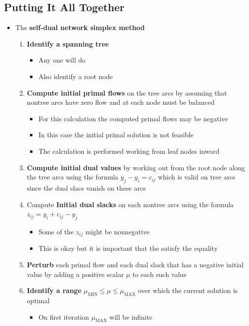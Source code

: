 \documentclass[11pt]{article}
\begin{document}
\subsection{Putting It All Together}
\label{sec:orgc6a8be1}
\begin{itemize}
\item The \textbf{self-dual network simplex method}
\begin{enumerate}
\item \textbf{Identify a spanning tree}
\begin{itemize}
\item Any one will do
\item Also identify a root node
\end{itemize}
\item \textbf{Compute initial primal flows} on the tree arcs by assuming that nontree arcs have zero flow and at each node must be balanced
\begin{itemize}
\item For this calculation the computed primal flows may be negative
\item In this case the initial primal solution is not feasible
\item The calculation is performed working from leaf nodes inward
\end{itemize}
\item \textbf{Compute initial dual values} by working out from the root node along the tree arcs using the formula \(y_j - y_i = c_{ij}\) which is valid on tree arcs since the dual slacs vanish on these arcs
\item Compute \textbf{Initial dual slacks} on each nontree arcs using the formula \(z_{ij} = y_i + c_{ij} - y_j\)
\begin{itemize}
\item Some of the \(z_{ij}\) might be nonnegative
\item This is okay but it is important that the satisfy the equality
\end{itemize}
\item \textbf{Perturb} each primal flow and each dual slack that has a negative initial value by adding a positive scalar \(\mu\) to each such value
\item \textbf{Identify a range} \(\mu_{\text{MIN}} \leq \mu \leq \mu_{\text{MAX}}\) over which the current solution is optimal
\begin{itemize}
\item On first iteration \(\mu_{\text{MAX}}\) will be infinite
\end{itemize}

\end{enumerate}
\end{itemize}
\end{document}
